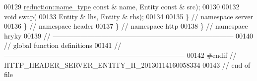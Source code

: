 \begin{DoxyCode}
00129         \hyperlink{namespacehryky_1_1reduction_ac686c30a4c8d196bbd0f05629a6b921f}{reduction::name_type} \textcolor{keyword}{const} & name, Entity \textcolor{keyword}{const} & src);
00130 
00132     \textcolor{keywordtype}{void} \hyperlink{namespacehryky_1_1http_a38e62595ad532d18fbc65ceb61973aec}{swap}(
00133         Entity & lhs, Entity & rhs);
00134 
00135 \} \textcolor{comment}{// namespace server}
00136 \} \textcolor{comment}{// namespace header}
00137 \} \textcolor{comment}{// namespace http}
00138 \} \textcolor{comment}{// namespace hryky}
00139 \textcolor{comment}{//
      ------------------------------------------------------------------------------}
00140 \textcolor{comment}{// global function definitions}
00141 \textcolor{comment}{//
      ------------------------------------------------------------------------------}
00142 \textcolor{preprocessor}{#endif // HTTP\_HEADER\_SERVER\_ENTITY\_H\_20130114160058334}
00143 \textcolor{preprocessor}{}\textcolor{comment}{// end of file}
\end{DoxyCode}
